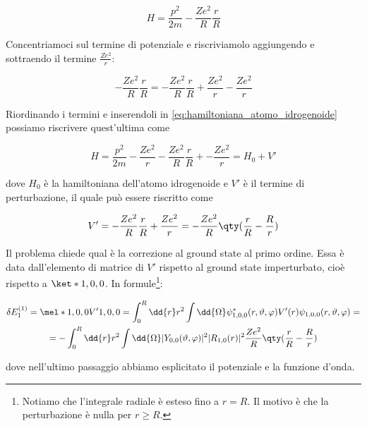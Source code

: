 \begin{soluzione}
   \begin{equation}
      H=\frac{p^2}{2m} - \frac{Ze^2}{R} \frac{r}{R}
      \label{eq:hamiltoniana_atomo_idrogenoide}
   \end{equation}

   Concentriamoci sul termine di potenziale e riscriviamolo aggiungendo e sottraendo il termine $\frac{Z e^2}{r}$:

   \begin{equation*}
      -\frac{Ze^2}{R} \frac{r}{R}
      =-\frac{Ze^2}{R} \frac{r}{R} + \frac{Z e^2}{r} - \frac{Z e^2}{r}
   \end{equation*}

   Riordinando i termini e inserendoli in \eqref{eq:hamiltoniana_atomo_idrogenoide} possiamo riscrivere quest'ultima come

   \begin{equation*}
      H
      =\frac{p^2}{2m} - \frac{Z e^2}{r} - \frac{Ze^2}{R} \frac{r}{R} + - \frac{Z e^2}{r}
      =H_0 + V'
   \end{equation*}
   
   dove $H_0$ è la hamiltoniana dell'atomo idrogenoide e $V'$ è il termine di perturbazione, il quale può essere riscritto come

   \begin{equation*}
      V'
      =-\frac{Ze^2}{R} \frac{r}{R} + \frac{Z e^2}{r}
      =-\frac{Z e^2}{R} \qty( \frac{r}{R} - \frac{R}{r} )
   \end{equation*}

   Il problema chiede qual è la correzione al ground state al primo ordine. Essa è data dall'elemento di matrice di $V'$ rispetto al ground state imperturbato, cioè rispetto a $\ket*{1,0,0}$. In formule\footnote{Notiamo che l'integrale radiale è esteso fino a $r=R$. Il motivo è che la perturbazione è nulla per $r \geq R$.}:
   
   \begin{gather*}
      \delta E_1^{(1)}
      =\mel*{1,0,0}{V'}{1,0,0}
      =\int_{0}^{R} \dd{r} r^2 \int \dd{\Omega} \psi^*_{1,0,0}(r,\vartheta,\varphi) V'(r) \psi_{1,0,0}(r,\vartheta,\varphi)
      =
      \\
      =-\int_{0}^{R} \dd{r} r^2 \int \dd{\Omega} |Y_{0,0}(\vartheta,\varphi)|^2 |R_{1,0}(r)|^2 \frac{Z e^2}{R} \qty( \frac{r}{R} - \frac{R}{r} )
   \end{gather*}

   dove nell'ultimo passaggio abbiamo esplicitato il potenziale e la funzione d'onda.


\end{soluzione}

